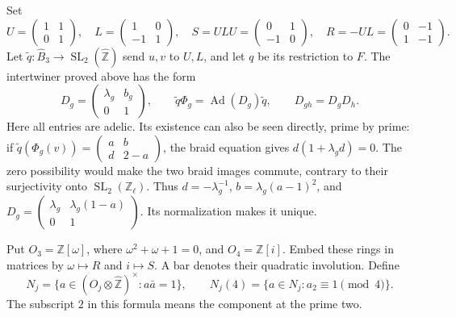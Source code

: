 Set
\[
 U=\begin{pmatrix}1&1\\0&1\end{pmatrix},\quad
 L=\begin{pmatrix}1&0\\-1&1\end{pmatrix},\quad
 S=ULU=\begin{pmatrix}0&1\\-1&0\end{pmatrix},\quad
 R=-UL=\begin{pmatrix}0&-1\\1&-1\end{pmatrix}.
\]
Let $\widetilde q:\widehat B_3\to
\operatorname{SL}_2(\widehat{\mathbb Z})$ send $u,v$ to $U,L$,
and let $q$ be its restriction to $F$.  The intertwiner proved above
has the form
\begin{equation}
 D_g=\begin{pmatrix}\lambda_g&b_g\\0&1\end{pmatrix},\qquad
 \widetilde q\Phi_g=\operatorname{Ad}(D_g)\widetilde q,\qquad
 D_{gh}=D_gD_h.
 \label{eq:adelic-frame-intertwiner}
\end{equation}
Here all entries are adelic.  Its existence can also be seen directly,
prime by prime: if
$\widetilde q(\Phi_g(v))=\left(\begin{smallmatrix}
 a&b\\d&2-a\end{smallmatrix}\right)$, the braid equation gives
$d(1+\lambda_gd)=0$.  The zero possibility would make the two
braid images commute, contrary to their surjectivity onto
$\operatorname{SL}_2(\mathbb Z_\ell)$.  Thus
$d=-\lambda_g^{-1}$, $b=\lambda_g(a-1)^2$, and
$D_g=\left(\begin{smallmatrix}\lambda_g&\lambda_g(1-a)\\0&1
\end{smallmatrix}\right)$.  Its normalization makes it unique.

Put $O_3=\mathbb Z[\omega]$, where $\omega^2+\omega+1=0$,
and $O_4=\mathbb Z[i]$.  Embed these rings in matrices by
$\omega\mapsto R$ and $i\mapsto S$.  A bar denotes their quadratic
involution.  Define
\begin{equation}
 N_j=\{a\in(O_j\otimes\widehat{\mathbb Z})^{\times}:
                                      a\bar a=1\},\qquad
 N_j(4)=\{a\in N_j:a_2\equiv1\pmod4\}.
 \label{eq:adelic-cm-targets}
\end{equation}
The subscript $2$ in this formula means the component at the prime two.

